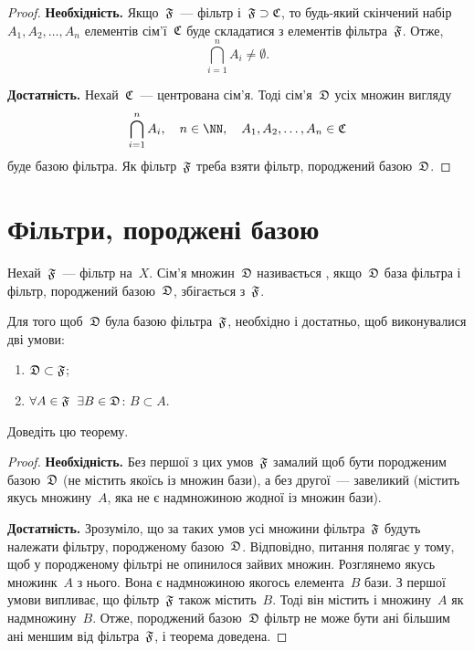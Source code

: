 \begin{proof}
    \textbf{Необхідність.} Якщо~$\frak F$~--- фільтр і~$\frak F \supset \frak C$, то будь-який скінчений набір~$A_1, A_2, \dots, A_n$ елементів сім'ї~$\frak C$ буде складатися з елементів фільтра~$\frak F$. Отже, 
    \begin{equation*}
        \bigcap_{i = 1}^n A_i \ne \emptyset.
    \end{equation*}

    \textbf{Достатність.} Нехай~$\frak C$~--- центрована сім'я. Тоді сім'я~$\frak D$ усіх множин вигляду
    \begin{equation*}
        \bigcap_{i = 1}^n A_i, \quad n \in \NN, \quad A_1, A_2, \dots, A_n \in \frak C
    \end{equation*}
    буде базою фільтра. Як фільтр~$\frak F$ треба взяти фільтр, породжений базою~$\frak D$.
\end{proof}

\section{Фільтри, породжені базою}

\begin{definition}
    Нехай~$\frak F$~--- фільтр на~$X$. Сім'я множин~$\frak D$ називається , якщо~$\frak D$ база фільтра і фільтр, породжений базою~$\frak D$, збігається з~$\frak F$.
\end{definition}

\begin{theorem}
    \label{th:filterbase-criterion}
    Для того щоб~$\frak D$ була базою фільтра~$\frak F$, необхідно і достатньо, щоб виконувалися дві умови:
    \begin{enumerate}
        \item $\frak D \subset \frak F$;
        \item $\forall A \in \frak F$~$\exists B \in \frak D$: $B \subset A$.
    \end{enumerate}
\end{theorem}

\begin{exercise}
    Доведіть цю теорему.
\end{exercise}
\begin{proof}
    \textbf{Необхідність.} Без першої з цих умов~$\frak F$ замалий щоб бути породженим базою~$\frak D$ (не містить якоїсь із множин бази), а без другої~--- завеликий (містить якусь множину~$A$, яка не є надмножиною жодної із множин бази). 
    
    \textbf{Достатність.} Зрозуміло, що за таких умов усі множини фільтра~$\frak F$ будуть належати фільтру, породженому базою~$\frak D$. Відповідно, питання полягає у тому, щоб у породженому фільтрі не опинилося зайвих множин. Розглянемо якусь множинк~$A$ з нього. Вона є надмножиною якогось елемента~$B$ бази. З першої умови випливає, що фільтр~$\frak F$ також містить~$B$. Тоді він містить і множину~$A$ як надмножину~$B$. Отже, породжений базою~$\frak D$ фільтр не може бути ані більшим ані меншим від фільтра~$\frak F$, і теорема доведена.
\end{proof}

